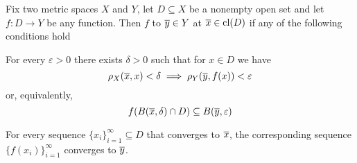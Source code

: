 \begin{proposition}\label{thm:metric_convergence_of_function_at_point}
  Fix two metric spaces \( X \) and \( Y \), let \( D \subseteq X \) be a nonempty open set and let \( f: D \to Y \) be any function. Then \( f \)  to \( \overline{y} \in Y \) at \( \overline{x} \in \operatorname{cl}(D) \) if any of the following conditions hold
  \begin{propenum}
     For every \( \varepsilon > 0 \) there exists \( \delta > 0 \) such that for \( x \in D \) we have
    \begin{equation*}
      \rho_X(\overline{x}, x) < \delta \implies \rho_Y(\overline{y}, f(x)) < \varepsilon
    \end{equation*}
    or, equivalently,
    \begin{equation}\label{def:convergence_of_function_at_point/balls/inclusion}
      f(B(\overline{x}, \delta) \cap D) \subseteq B(\overline{y}, \varepsilon)
    \end{equation}

     For every sequence \( \{ x_i \}_{i=1}^\infty \subseteq D \) that converges to \( \overline{x} \), the corresponding sequence \( \{ f(x_i) \}_{i=1}^\infty \) converges to \( \overline{y} \).
  \end{propenum}
\end{proposition}
